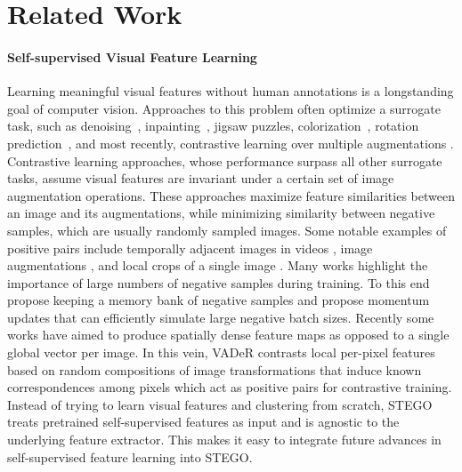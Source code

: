\documentclass{article} \usepackage{iclr2022_conference,times}
\begin{document}
\section{Related Work}


\paragraph{Self-supervised Visual Feature Learning}
Learning meaningful visual features without human annotations is a longstanding goal of computer vision. Approaches to this problem often optimize a surrogate task, such as denoising~\citep{vincent2008extracting}, inpainting~\citep{pathakCVPR16context}, jigsaw puzzles, colorization~\citep{zhang2017split}, rotation prediction~\citep{gidaris2018unsupervised}, and most recently, contrastive learning over multiple augmentations \citep{deepinfomax, simclrv2, simclrv2, mocov2, oord2018representation}. Contrastive learning approaches, whose performance surpass all other surrogate tasks, assume visual features are invariant under a certain set of image augmentation operations. These approaches maximize feature similarities between an image and its augmentations, while minimizing similarity between negative samples, which are usually randomly sampled images. Some notable examples of positive pairs include temporally adjacent images in videos \citep{oord2018representation}, image augmentations \citep{simclrv2,mocov2}, and local crops of a single image \citep{deepinfomax}. Many works highlight the importance of large numbers of negative samples during training. To this end \cite{wu2018unsupervised} propose keeping a memory bank of negative samples and \cite{mocov2} propose momentum updates that can efficiently simulate large negative batch sizes. Recently some works have aimed to produce spatially dense feature maps as opposed to a single global vector per image. In this vein, VADeR \citep{pinheiro2020unsupervised} contrasts local per-pixel features based on random compositions of image transformations that induce known correspondences among pixels which act as positive pairs for contrastive training. Instead of trying to learn visual features and clustering from scratch, STEGO treats pretrained self-supervised features as input and is agnostic to the underlying feature extractor. This makes it easy to integrate future advances in self-supervised feature learning into STEGO.
\end{document}
